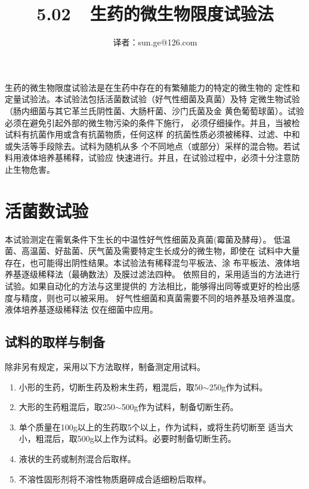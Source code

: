\documentclass[11pt,a4paper]{article}
\title{5.02~~生药的微生物限度试验法}
\author{译者：sun.ge@126.com}
\newenvironment{SC}{%
  \CJKfamily{gbsn}%
  \CJKtilde
  \CJKnospace}{}
\begin{document}
\begin{CJK}{UTF8}{}
\begin{SC}

\maketitle
\thispagestyle{myheadings}
生药的微生物限度试验法是在生药中存在的有繁殖能力的特定的微生物的
定性和定量试验法。本试验法包括活菌数试验（好气性细菌及真菌）及特
定微生物试验（肠内细菌与其它革兰氏阴性菌、大肠杆菌、沙门氏菌及金
黄色葡萄球菌）。试验必须在避免引起外部的微生物污染的条件下施行，
必须仔细操作。并且，当被检试料有抗菌作用或含有抗菌物质，任何这样
的抗菌性质必须被稀释、过滤、中和或失活等手段除去。试料为随机从多
个不同地点（或部分）采样的混合物。若试料用液体培养基稀释，试验应
快速进行。并且，在试验过程中，必须十分注意防止生物危害。

\section{活菌数试验}
本试验测定在需氧条件下生长的中温性好气性细菌及真菌(霉菌及酵母）。
低温菌、高温菌、好盐菌、厌气菌及需要特定生长成分的微生物，即使在
试料中大量存在，也可能得出阴性结果。本试验法有稀释混匀平板法、涂
布平板法、液体培养基逐级稀释法（最确数法）及膜过滤法四种。
依照目的，采用适当的方法进行试验。如果自动化的方法与这里提供的
方法相比，能够得出同等或更好的检出感度与精度，则也可以被采用。
好气性细菌和真菌需要不同的培养基及培养温度。液体培养基逐级稀释法
仅在细菌中应用。

\renewcommand{\labelenumi}{（\arabic{enumi}）}
\subsection*{试料的取样与制备}
除非另有规定，采用以下方法取样，制备测定用试料。
\begin{enumerate}
\item 小形的生药，切断生药及粉末生药，粗混后，取50$\sim$250g作为试料。
\item 大形的生药粗混后，取250$\sim$500g作为试料，制备切断生药。
\item 单个质量在100g以上的生药取5个以上，作为试料，或将生药切断至
适当大小，粗混后，取500g以上作为试料。必要时制备切断生药。
\item 液状的生药或制剂混合后取样。
\item 不溶性固形剂将不溶性物质磨碎成合适细粉后取样。
\end{enumerate}


\end{SC}
\end{CJK}
\end{document}
